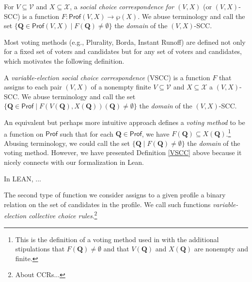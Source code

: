 \documentclass[runningheads]{llncs}
\begin{document}
\begin{definition} \textnormal{For $V\subseteq\mathcal{V}$ and $X\subseteq\mathcal{X}$, a \textit{social choice correspondence for $(V,X)$} (or $(V,X)$-SCC) is a function  $F: \mathsf{Prof}(V,X)\to \wp(X)$. We abuse terminology and call the set $\{\mathbf{Q}\in\mathsf{Prof}(V,X)\mid F(\mathbf{Q})\neq\emptyset \}$ the \textit{domain} of the $(V,X)$-SCC.}
\end{definition}

Most voting methods (e.g., Plurality, Borda, Instant Runoff) are defined not only for a fixed set of voters and candidates but for any set of voters and candidates, which motivates the following definition.

\begin{definition}\label{VSCC} \textnormal{A \textit{variable-election social choice correspondence} (VSCC) is a function $F$ that assigns to each pair $(V,X)$ of a nonempty finite $V\subseteq \mathcal{V}$ and $X\subseteq\mathcal{X}$ a $(V,X)$-SCC. We abuse terminology and call the set $\{\mathbf{Q}\in\mathsf{Prof}\mid F(V(\mathbf{Q}),X(\mathbf{Q}))(\mathbf{Q})\neq\emptyset \}$ the \textit{domain} of the $(V,X)$-SCC.}
\end{definition}

An equivalent but perhaps more intuitive approach defines a \textit{voting method} to be a function on $\mathsf{Prof}$ such that for each $\mathbf{Q}\in\mathsf{Prof}$, we have $F(\mathbf{Q})\subseteq X(\mathbf{Q})$.\footnote{This is the definition of a voting method used in \cite{} with the additional stipulations that $F(\mathbf{Q})\neq\emptyset$ and  that $V(\mathbf{Q})$ and $X(\mathbf{Q})$ are nonempty and finite.} Abusing terminology, we could call the set $\{\mathbf{Q}\mid F(\mathbf{Q})\neq\emptyset\}$ the \emph{domain} of the voting method. However, we have presented Definition \ref{VSCC} above because it nicely connects with our formalization in Lean.



In LEAN, ...

The second type of function we consider assigns to a given profile a binary relation on the set of candidates in the profile. We call such functions \textit{variable-election collective choice rules}.\footnote{About CCRs...}  
\end{document}
